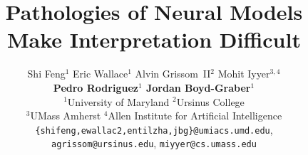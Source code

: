 \documentclass[11pt,a4paper]{article}
\title{Pathologies of Neural Models Make Interpretation Difficult}
\author{
  Shi Feng$^1$ Eric Wallace$^1$ Alvin Grissom~II$^2$ Mohit Iyyer$^{3,4}$\\
  {\bf Pedro Rodriguez$^1$ Jordan Boyd-Graber$^1$}\\
  $^1$University of Maryland $^2$Ursinus College\\
  $^3$UMass Amherst $^4$Allen Institute for Artificial Intelligence\\
  {\tt \{shifeng,ewallac2,entilzha,jbg\}@umiacs.umd.edu}, \\
  {\tt agrissom@ursinus.edu}, {\tt miyyer@cs.umass.edu}\\
}
\date{}
\begin{document}
\maketitle
\begin{abstract}

\end{abstract}






\newpage
% 

\newpage





\clearpage

% 
\end{document}
